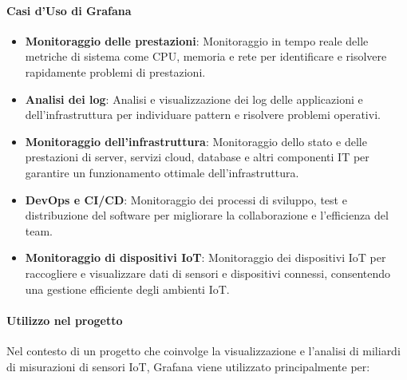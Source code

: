 \paragraph{Casi d'Uso di Grafana}
\begin{itemize}
    \item \textbf{Monitoraggio delle prestazioni}: Monitoraggio in tempo reale delle metriche di sistema come CPU, memoria e rete per identificare e risolvere rapidamente problemi di prestazioni.
    
    \item \textbf{Analisi dei log}: Analisi e visualizzazione dei log delle applicazioni e dell'infrastruttura per individuare pattern e risolvere problemi operativi.
    
    \item \textbf{Monitoraggio dell'infrastruttura}: Monitoraggio dello stato e delle prestazioni di server, servizi cloud, database e altri componenti IT per garantire un funzionamento ottimale dell'infrastruttura.
    
    \item \textbf{DevOps e CI/CD}: Monitoraggio dei processi di sviluppo, test e distribuzione del software per migliorare la collaborazione e l'efficienza del team.
    
    \item \textbf{Monitoraggio di dispositivi IoT}: Monitoraggio dei dispositivi IoT per raccogliere e visualizzare dati di sensori e dispositivi connessi, consentendo una gestione efficiente degli ambienti IoT.
\end{itemize}
\paragraph{Utilizzo nel progetto}
Nel contesto di un progetto che coinvolge la visualizzazione e l'analisi di miliardi di misurazioni di sensori IoT, Grafana viene utilizzato principalmente per:

